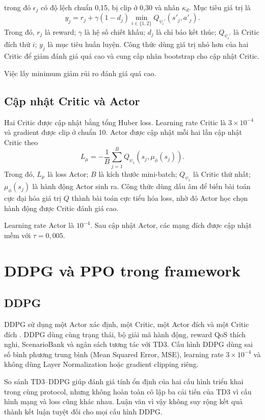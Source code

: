 trong đó $\epsilon_j$ có độ lệch chuẩn 0,15, bị clip ở 0,30 và nhân $\kappa_d$. Mục tiêu giá trị là
\begin{equation}
 y_j=r_j+\gamma(1-d_j)\min_{i\in\{1,2\}}Q_{\psi_i'}(s'_j,a'_j).
 \label{eq:td3-target-ch3}
\end{equation}
Trong đó, $r_j$ là reward; $\gamma$ là hệ số chiết khấu; $d_j$ là chỉ báo kết thúc; $Q_{\psi_i'}$ là Critic đích thứ $i$; $y_j$ là mục tiêu huấn luyện. Công thức dùng giá trị nhỏ hơn của hai Critic để giảm đánh giá quá cao và cung cấp nhãn bootstrap cho cập nhật Critic.

Việc lấy minimum giảm rủi ro đánh giá quá cao.

\subsection{Cập nhật Critic và Actor}
Hai Critic được cập nhật bằng tổng Huber loss. Learning rate Critic là $3\times10^{-4}$ và gradient được clip ở chuẩn 10. Actor được cập nhật mỗi hai lần cập nhật Critic theo
\begin{equation}
 L_{\mu}=-\frac{1}{B}\sum_{j=1}^{B}Q_{\psi_1}(s_j,\mu_{\phi}(s_j)).
\end{equation}
Trong đó, $L_{\mu}$ là loss Actor; $B$ là kích thước mini-batch; $Q_{\psi_1}$ là Critic thứ nhất; $\mu_{\phi}(s_j)$ là hành động Actor sinh ra. Công thức dùng dấu âm để biến bài toán cực đại hóa giá trị $Q$ thành bài toán cực tiểu hóa loss, nhờ đó Actor học chọn hành động được Critic đánh giá cao.

Learning rate Actor là $10^{-4}$. Sau cập nhật Actor, các mạng đích được cập nhật mềm với $\tau=0{,}005$.

\section{DDPG và PPO trong framework}
\subsection{DDPG}
DDPG sử dụng một Actor xác định, một Critic, một Actor đích và một Critic đích \cite{Lillicrap2015DDPG}. DDPG dùng cùng trạng thái, bộ giải mã hành động, reward QoS thích nghi, ScenarioBank và ngân sách tương tác với TD3. Cấu hình DDPG dùng sai số bình phương trung bình (Mean Squared Error, MSE), learning rate $3\times10^{-4}$ và không dùng Layer Normalization hoặc gradient clipping riêng.

So sánh TD3--DDPG giúp đánh giá tính ổn định của hai cấu hình triển khai trong cùng protocol, nhưng không hoàn toàn cô lập ba cải tiến của TD3 vì cấu hình mạng và loss cũng khác nhau. Luận văn vì vậy không suy rộng kết quả thành kết luận tuyệt đối cho mọi cấu hình DDPG.

